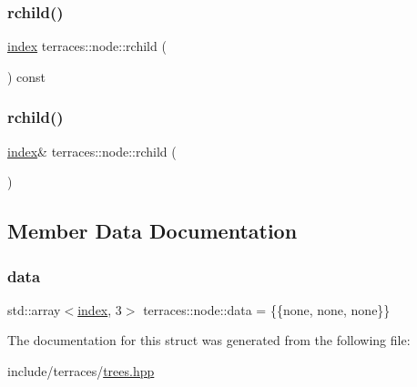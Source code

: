 \subsubsection{\texorpdfstring{rchild()}{rchild()}\hspace{0.1cm}{\footnotesize\ttfamily [1/2]}}
{\footnotesize\ttfamily \hyperlink{namespaceterraces_adbc33ccb543d1634e96d0eb02e472c77}{index} terraces\+::node\+::rchild (\begin{DoxyParamCaption}{ }\end{DoxyParamCaption}) const\hspace{0.3cm}{\ttfamily [inline]}}

\mbox{\label{structterraces_1_1node_a7d53d6f802bc0fa727c67a72033c15ad}} 
\subsubsection{\texorpdfstring{rchild()}{rchild()}\hspace{0.1cm}{\footnotesize\ttfamily [2/2]}}
{\footnotesize\ttfamily \hyperlink{namespaceterraces_adbc33ccb543d1634e96d0eb02e472c77}{index}\& terraces\+::node\+::rchild (\begin{DoxyParamCaption}{ }\end{DoxyParamCaption})\hspace{0.3cm}{\ttfamily [inline]}}



\subsection{Member Data Documentation}
\mbox{\label{structterraces_1_1node_aee217f5c4b1af9fc69f59b278f656663}} 
\subsubsection{\texorpdfstring{data}{data}}
{\footnotesize\ttfamily std\+::array$<$\hyperlink{namespaceterraces_adbc33ccb543d1634e96d0eb02e472c77}{index}, 3$>$ terraces\+::node\+::data = \{\{none, none, none\}\}}



The documentation for this struct was generated from the following file\+:\begin{DoxyCompactItemize}
\item 
include/terraces/\hyperlink{trees_8hpp}{trees.\+hpp}\end{DoxyCompactItemize}
